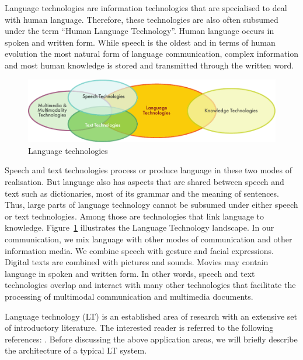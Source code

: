 
\begin{multicols}{2}

Language technologies are information technologies that are specialised to deal with human language. Therefore, these technologies are also often subsumed under the term ``Human Language Technology''. Human language occurs in spoken and written form. While speech is the oldest and in terms of human evolution the most natural form of language communication, complex information and most human knowledge is stored and transmitted through the written word.

\begin{figure}[htb]
  \center
  \includegraphics[width=\textwidth]{../_media/english/language_technologies}
  \caption{Language technologies}
  \label{fig:ltincontext_en}
\end{figure}

Speech and text technologies process or produce language in these two modes of realisation. But language also has aspects that are shared between speech and text such as dictionaries, most of its grammar and the meaning of sentences. Thus, large parts of language technology cannot be subsumed under either speech or text technologies. Among those are technologies that link language to knowledge. Figure~\ref{fig:ltincontext_en}  illustrates the Language Technology landscape. In our communication, we mix language with other modes of communication and other information media. We combine speech with gesture and facial expressions. Digital texts are combined with pictures and sounds. Movies may contain language in spoken and written form. In other words, speech and text technologies overlap and interact with many other technologies that facilitate the processing of multimodal communication and multimedia documents.  

Language technology (LT) is an established area of research with an extensive set of introductory literature. The interested reader is referred to the following references:  \cite{jurafsky-martin01, manning-schuetze1, lt-world1, lt-survey1}. Before discussing the above application areas, we will briefly describe the architecture of a typical LT system.


\end{multicols}
